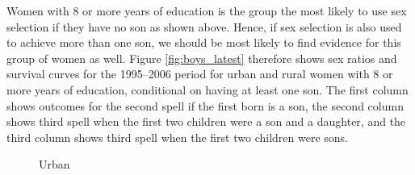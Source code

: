 \documentclass[12pt,letterpaper]{article}
\begin{document}
Women with 8 or more years of education is the group the most likely to use sex 
selection if they have no son as shown above.
Hence, if sex selection is also used to achieve more than one son, we should be
most likely to find evidence for this group of women as well.
Figure \ref{fig:boys_latest} therefore shows sex ratios and survival curves for 
the 1995--2006 period for urban and rural women with 8 or more years of education, 
conditional on having at least one son.
The first column shows outcomes for the second spell if the first born is a son,
the second column shows third spell when the first two children were a son and 
a daughter, and the third column shows third spell when the first two children were sons.


\begin{figure}[htpb]
\centering
\caption*{Urban}
\setcounter{subfigure}{-2}
\setcounter{subfigure}{-1}
\setcounter{subfigure}{0}
\end{figure}
\end{document}
